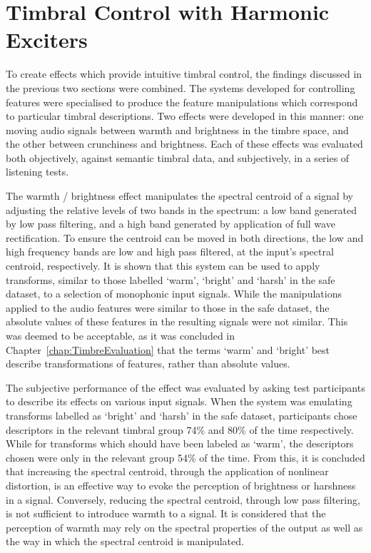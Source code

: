 \section{Timbral Control with Harmonic Exciters}
\label{sec:Conclusion-TimbralControl}
	To create effects which provide intuitive timbral control, the findings discussed in the previous two sections were
	combined. The systems developed for controlling features were specialised to produce the feature manipulations which
	correspond to particular timbral descriptions. Two effects were developed in this manner: one moving audio signals
	between warmth and brightness in the timbre space, and the other between crunchiness and brightness. Each of these
	effects was evaluated both objectively, against semantic timbral data, and subjectively, in a series of listening
	tests.

	The warmth / brightness effect manipulates the spectral centroid of a signal by adjusting the relative levels of two
	bands in the spectrum: a low band generated by low pass filtering, and a high band generated by application of full
	wave rectification. To ensure the centroid can be moved in both directions, the low and high frequency bands are low
	and high pass filtered, at the input's spectral centroid, respectively. It is shown that this system can be used to
	apply transforms, similar to those labelled `warm', `bright' and `harsh' in the \acrshort{safe} dataset, to a
	selection of monophonic input signals. While the manipulations applied to the audio features were similar to those
	in the \acrshort{safe} dataset, the absolute values of these features in the resulting signals were not similar.
	This was deemed to be acceptable, as it was concluded in Chapter~\ref{chap:TimbreEvaluation} that the terms `warm'
	and `bright' best describe transformations of features, rather than absolute values.

	The subjective performance of the effect was evaluated by asking test participants to describe its effects on
	various input signals. When the system was emulating transforms labelled as `bright' and `harsh' in the
	\acrshort{safe} dataset, participants chose descriptors in the relevant timbral group 74\% and 80\% of the time
	respectively. While for transforms which should have been labeled as `warm', the descriptors chosen were only in the
	relevant group 54\% of the time. From this, it is concluded that increasing the spectral centroid, through the
	application of nonlinear distortion, is an effective way to evoke the perception of brightness or harshness in a
	signal. Conversely, reducing the spectral centroid, through low pass filtering, is not sufficient to introduce
	warmth to a signal. It is considered that the perception of warmth may rely on the spectral properties of the output
	as well as the way in which the spectral centroid is manipulated.


